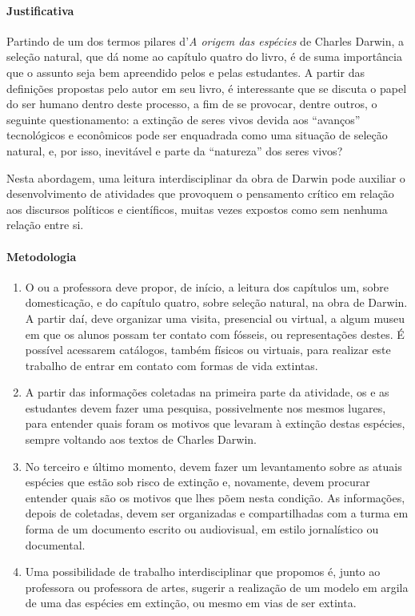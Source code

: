 \documentclass[11pt]{extarticle}
\begin{document}
\paragraph{Justificativa} Partindo de um dos termos pilares d'\textit{A origem das espécies}
de Charles Darwin, a seleção natural, que dá nome ao capítulo quatro do livro, 
é de suma importância que o assunto seja bem apreendido pelos e pelas estudantes. 
A partir das definições propostas pelo autor em seu livro, é interessante que
se discuta o papel do ser humano dentro deste processo, a fim de se provocar, dentre
outros, o seguinte questionamento: a extinção de seres vivos devida aos ``avanços'' 
tecnológicos e econômicos pode ser enquadrada como uma situação de seleção natural,
e, por isso, inevitável e parte da ``natureza'' dos seres vivos? 

Nesta abordagem, uma leitura interdisciplinar da obra de Darwin pode auxiliar
o desenvolvimento de atividades que provoquem o pensamento crítico em relação
aos discursos políticos e científicos, muitas vezes expostos como sem nenhuma
relação entre si. 

\paragraph{Metodologia}

\begin{enumerate}

	\item
	O ou a professora deve propor, de início, a leitura dos capítulos um, sobre domesticação,
	e do capítulo quatro, sobre seleção natural, na obra de Darwin. 
	A partir daí, deve organizar uma visita, presencial ou virtual, a algum museu em que os alunos possam
	ter contato com fósseis, ou representações destes. É possível acessarem catálogos, também
	físicos ou virtuais, para realizar este trabalho de entrar em contato com formas de vida
	extintas. 

	\item
	A partir das informações coletadas na primeira parte da atividade, os e as estudantes
	devem fazer uma pesquisa, possivelmente nos mesmos lugares, para entender
	quais foram os motivos que levaram à extinção destas espécies, sempre voltando
	aos textos de Charles Darwin.

	\item
	No terceiro e último momento, devem fazer um levantamento sobre as atuais
	espécies que estão sob risco de extinção e, novamente, devem procurar
	entender quais são os motivos que lhes põem nesta condição. As informações,
	depois de coletadas, devem ser organizadas e compartilhadas com a turma em forma 
	de um documento escrito ou audiovisual, em estilo jornalístico ou documental. 

	\item
	Uma possibilidade de trabalho interdisciplinar que propomos é, junto ao
	professora ou professora de artes, sugerir a realização de um modelo
	em argila de uma das espécies em extinção, ou mesmo em vias de ser extinta.

\end{enumerate}
\end{document}
